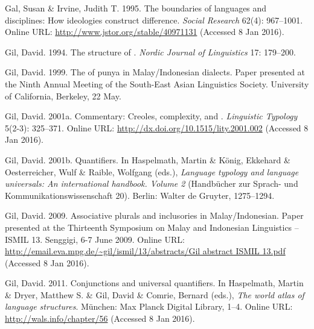 \begin{styleCitaviBibliographyEntry}
Gal, Susan \& Irvine, Judith T. 1995. The boundaries of languages and disciplines: How ideologies construct difference. \textit{Social Research} 62(4): 967–1001. Online URL: \url{http://www.jstor.org/stable/40971131} (Accessed 8 Jan 2016).
\end{styleCitaviBibliographyEntry}

\begin{styleCitaviBibliographyEntry}
Gil, David. 1994. The structure of . \textit{Nordic Journal of Linguistics} 17: 179–200.
\end{styleCitaviBibliographyEntry}

\begin{styleCitaviBibliographyEntry}
Gil, David. 1999. The  of punya in Malay/Indonesian dialects. Paper presented at the Ninth Annual Meeting of the South-East Asian Linguistics Society. University of California, Berkeley, 22 May.
\end{styleCitaviBibliographyEntry}

\begin{styleCitaviBibliographyEntry}
Gil, David. 2001a. Commentary: Creoles, complexity, and . \textit{Linguistic Typology} 5(2-3): 325–371. Online URL: \url{http://dx.doi.org/10.1515/lity.2001.002} (Accessed 8 Jan 2016).
\end{styleCitaviBibliographyEntry}

\begin{styleCitaviBibliographyEntry}
Gil, David. 2001b. Quantifiers. In Haspelmath, Martin \& König, Ekkehard \& Oesterreicher, Wulf \& Raible, Wolfgang (eds.), \textit{Language typology and language universals: An international handbook. Volume 2} (Handbücher zur Sprach- und Kommunikationswissenschaft 20). Berlin: Walter de Gruyter, 1275–1294.
\end{styleCitaviBibliographyEntry}

\begin{styleCitaviBibliographyEntry}
Gil, David. 2009. Associative plurals and inclusories in Malay/Indonesian. Paper presented at the Thirteenth Symposium on Malay and Indonesian Linguistics – ISMIL 13. Senggigi, 6-7 June 2009. Online URL: \url{http://email.eva.mpg.de/~gil/ismil/13/abstracts/Gil abstract ISMIL 13.pdf} (Accessed 8 Jan 2016).
\end{styleCitaviBibliographyEntry}

\begin{styleCitaviBibliographyEntry}
Gil, David. 2011. Conjunctions and universal quantifiers. In Haspelmath, Martin \& Dryer, Matthew S. \& Gil, David \& Comrie, Bernard (eds.), \textit{The world atlas of language structures}. München: Max Planck Digital Library, 1–4. Online URL: \url{http://wals.info/chapter/56} (Accessed 8 Jan 2016).
\end{styleCitaviBibliographyEntry}

